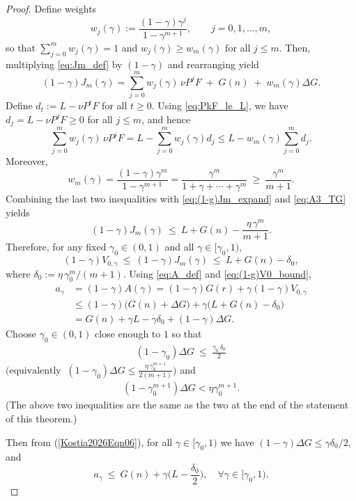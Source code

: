 \documentclass[letterpaper,10pt,conference]{ieeeconf}  %
\begin{document}
\begin{proof}
Define weights
\[
w_j(\gamma):=\frac{(1-\gamma)\gamma^j}{1-\gamma^{m+1}},\qquad j=0,1,\dots,m,
\]
so that $\sum_{j=0}^{m} w_j(\gamma)=1$ and $w_j(\gamma)\ge w_m(\gamma)$ for all $j\le m$.
Then, multiplying \eqref{eq:Jm_def} by $(1-\gamma)$ and rearranging {yield}
\begin{equation}\label{eq:(1-g)Jm_expand}
(1-\gamma)J_m(\gamma)=\sum_{j=0}^m w_j(\gamma)\,\nu P^jF\;+\;G(n)\;+\;w_m(\gamma)\Delta G.
\end{equation}
{Define $d_t := L - \nu P^t F$ for all $t\ge 0$.}
Using \eqref{eq:PkF_le_L}, we have $d_j = L-\nu P^jF\ge 0$ for all $j\le m$, and hence
\[
\sum_{j=0}^m w_j(\gamma)\,\nu P^jF
= L-\sum_{j=0}^m w_j(\gamma)d_j
\le L-w_m(\gamma)\sum_{j=0}^m d_j.
\]
Moreover,
\[
w_m(\gamma)=\frac{(1-\gamma)\gamma^m}{1-\gamma^{m+1}}
=\frac{\gamma^m}{1+\gamma+\cdots+\gamma^m}\ \ge\ \frac{\gamma^m}{m+1}.
\]
Combining the last two inequalities with \eqref{eq:(1-g)Jm_expand} and \eqref{eq:A3_TG} yields
\[
(1-\gamma)J_m(\gamma)\ \le\ L+G(n)-\frac{\eta\,\gamma^m}{m+1}.
\]
Therefore, for any fixed $\gamma_0\in(0,1)$ and all $\gamma\in[\gamma_0,1)$,
\begin{equation}\label{eq:(1-g)V0_bound}
(1-\gamma)V_{0,\gamma}\ \le\ (1-\gamma)J_m(\gamma)\ \le\ L+G(n)-\delta_0,
\end{equation}
where $\delta_0 := \eta\,\gamma_0^{m}/(m+1)$. Using \eqref{eq:A_def} and \eqref{eq:(1-g)V0_bound},
\begin{align}
a_\gamma
&=(1-\gamma){A(\gamma)}=(1-\gamma)G(r)+\gamma(1-\gamma)V_{0,\gamma}\nonumber\\
&\le (1-\gamma)\big(G(n)+\Delta G\big)+\gamma\big(L+G(n)-\delta_0\big)\nonumber\\
&= G(n)+\gamma L-\gamma\delta_0 + (1-\gamma)\Delta G.\nonumber
\end{align}
Choose $\gamma_0\in(0,1)$ close enough to $1$ so that
\begin{align}\label{Kostia2026Eqn06}
(1-\gamma_0)\Delta G\ \le\ \frac{\gamma_0\,\delta_0}{2}
\end{align}
$\Big(\text{equivalently }\
(1-\gamma_0)\Delta G\le \frac{\eta\,\gamma_0^{m+1}}{2(m+1)}\Big)$
and 
\begin{align}\label{Kostia2026Eqn07}
 (1-\gamma_0^{m+1})\Delta G<\eta \gamma_0^{m+1}.
\end{align}
(The above two inequalities are the same as the two at the end of the statement of this theorem.)

Then {from (\ref{Kostia2026Eqn06}),} for all $\gamma\in[\gamma_0,1)$ we have $(1-\gamma)\Delta G\le \gamma\delta_0/2$, and
\begin{equation}\label{eq:a_gamma_bound}
a_\gamma\ \le\ G(n)+\gamma\Big(L-\frac{\delta_0}{2}\Big),
\quad \forall \gamma\in[\gamma_0,1).
\end{equation}


\end{proof}
\end{document}
